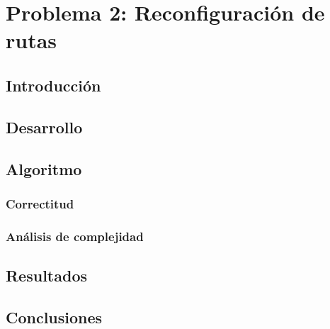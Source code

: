 \section{Problema 2: Reconfiguraci\'on de rutas}

\subsection{Introducci\'on}



\subsection{Desarrollo}

\subsection{Algoritmo}


\subsubsection{Correctitud}


\subsubsection{An\'alisis de complejidad}



\subsection{Resultados}



\subsection{Conclusiones}

